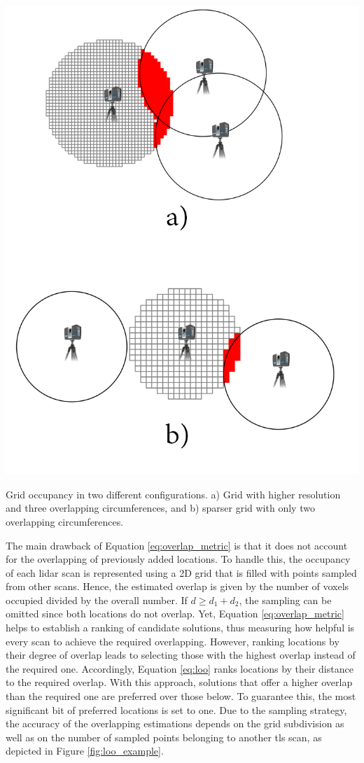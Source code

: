 \begin{marginfigure}[.0cm]
    \centering
    \includegraphics[width=\linewidth]{figs/lidar_optimization/loo.png}
	\caption{Grid occupancy in two different configurations. a) Grid with higher resolution and three overlapping circumferences, and b) sparser grid with only two overlapping circumferences.}
	\label{fig:loo_example}
\end{marginfigure}
The main drawback of Equation \ref{eq:overlap_metric} is that it does not account for the overlapping of previously added locations. To handle this, the occupancy of each \acrshort{lidar} scan is represented using a 2D grid that is filled with points sampled from other scans. Hence, the estimated overlap is given by the number of voxels occupied divided by the overall number. If $d \geq d_1 + d_2$, the sampling can be omitted since both locations do not overlap. Yet, Equation \ref{eq:overlap_metric} helps to establish a ranking of candidate solutions, thus measuring how helpful is every scan to achieve the required overlapping. However, ranking locations by their degree of overlap leads to selecting those with the highest overlap instead of the required one. Accordingly, Equation \ref{eq:loo} ranks locations by their distance to the required overlap. With this approach, solutions that offer a higher overlap than the required one are preferred over those below. To guarantee this, the most significant bit of preferred locations is set to one. Due to the sampling strategy, the accuracy of the overlapping estimations depends on the grid subdivision as well as on the number of sampled points belonging to another \acrshort{tls} scan, as depicted in Figure \ref{fig:loo_example}.
